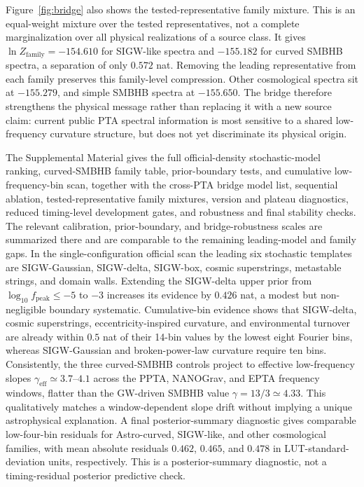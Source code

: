 \documentclass[aps,prl,reprint,superscriptaddress,nofootinbib,floatfix]{revtex4-2}
\begin{document}
Figure~\ref{fig:bridge} also shows the tested-representative family
mixture.  This is an equal-weight mixture over the tested representatives,
not a complete marginalization over all physical realizations of a source
class.  It gives
$\ln Z_\mathrm{family}=-154.610$ for SIGW-like spectra and
$-155.182$ for curved SMBHB spectra, a separation of only $0.572$ nat.
Removing the leading representative from each family preserves this
family-level compression.
Other cosmological spectra sit at $-155.279$, and simple SMBHB spectra
at $-155.650$.  The bridge therefore strengthens the physical message
rather than replacing it with a new source claim: current public PTA
spectral information is most sensitive to a shared low-frequency
curvature structure, but does not yet discriminate its physical origin.

The Supplemental Material gives the full official-density stochastic-model
ranking, curved-SMBHB family table, prior-boundary tests, and cumulative
low-frequency-bin scan, together with the cross-PTA bridge model list,
sequential ablation, tested-representative family mixtures, version and
plateau diagnostics, reduced timing-level development gates, and
robustness and final stability checks.  The relevant calibration,
prior-boundary, and bridge-robustness scales are summarized there and are
comparable to the remaining leading-model and family gaps.  In the
single-configuration
official scan the
leading six stochastic templates are SIGW-Gaussian, SIGW-delta, SIGW-box,
cosmic superstrings, metastable strings, and domain walls.  Extending the
SIGW-delta upper prior from $\log_{10}f_\mathrm{peak}\le -5$ to $-3$
increases its evidence by $0.426$ nat, a modest but non-negligible
boundary systematic.  Cumulative-bin evidence shows that SIGW-delta,
cosmic superstrings, eccentricity-inspired curvature, and environmental
turnover are already within $0.5$ nat of their 14-bin values by the
lowest eight Fourier bins, whereas SIGW-Gaussian and broken-power-law
curvature require ten bins.
Consistently, the three curved-SMBHB controls project to effective
low-frequency slopes $\gamma_\mathrm{eff}\simeq3.7$--$4.1$ across the
PPTA, NANOGrav, and EPTA frequency windows, flatter than the GW-driven
SMBHB value $\gamma=13/3\simeq4.33$.  This qualitatively matches a
window-dependent slope drift without implying a unique astrophysical
explanation.  A final posterior-summary diagnostic gives comparable
low-four-bin residuals for Astro-curved, SIGW-like, and other
cosmological families, with mean absolute residuals $0.462$, $0.465$,
and $0.478$ in LUT-standard-deviation units, respectively.  This is a
posterior-summary diagnostic, not a timing-residual posterior predictive
check.
\end{document}
